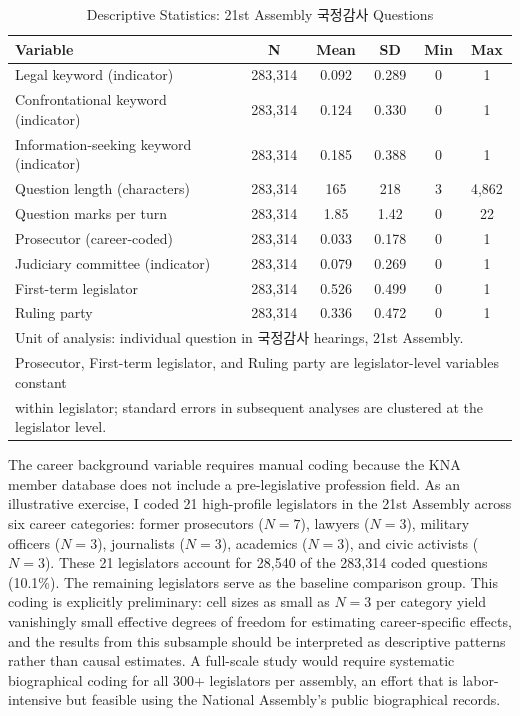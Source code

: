 \documentclass[11pt]{article}
\begin{document}
\begin{table}[htbp]
\centering
\caption{Descriptive Statistics: 21st Assembly 국정감사 Questions}
\label{tab:desc}
\begin{tabular}{lccccc}
\toprule
Variable & N & Mean & SD & Min & Max \\
\midrule
Legal keyword (indicator) & 283,314 & 0.092 & 0.289 & 0 & 1 \\
Confrontational keyword (indicator) & 283,314 & 0.124 & 0.330 & 0 & 1 \\
Information-seeking keyword (indicator) & 283,314 & 0.185 & 0.388 & 0 & 1 \\
Question length (characters) & 283,314 & 165 & 218 & 3 & 4,862 \\
Question marks per turn & 283,314 & 1.85 & 1.42 & 0 & 22 \\
Prosecutor (career-coded) & 283,314 & 0.033 & 0.178 & 0 & 1 \\
Judiciary committee (indicator) & 283,314 & 0.079 & 0.269 & 0 & 1 \\
First-term legislator & 283,314 & 0.526 & 0.499 & 0 & 1 \\
Ruling party & 283,314 & 0.336 & 0.472 & 0 & 1 \\
\bottomrule
\multicolumn{6}{l}{\footnotesize Unit of analysis: individual question in 국정감사 hearings, 21st Assembly.} \\
\multicolumn{6}{l}{\footnotesize Prosecutor, First-term legislator, and Ruling party are legislator-level variables constant} \\
\multicolumn{6}{l}{\footnotesize within legislator; standard errors in subsequent analyses are clustered at the legislator level.} \\
\end{tabular}
\end{table}

The career background variable requires manual coding because the KNA member database does not include a pre-legislative profession field. As an illustrative exercise, I coded 21 high-profile legislators in the 21st Assembly across six career categories: former prosecutors ($N = 7$), lawyers ($N = 3$), military officers ($N = 3$), journalists ($N = 3$), academics ($N = 3$), and civic activists ($N = 3$). These 21 legislators account for 28,540 of the 283,314 coded questions (10.1\%). The remaining legislators serve as the baseline comparison group. This coding is explicitly preliminary: cell sizes as small as $N = 3$ per category yield vanishingly small effective degrees of freedom for estimating career-specific effects, and the results from this subsample should be interpreted as descriptive patterns rather than causal estimates. A full-scale study would require systematic biographical coding for all 300+ legislators per assembly, an effort that is labor-intensive but feasible using the National Assembly's public biographical records.
\end{document}
